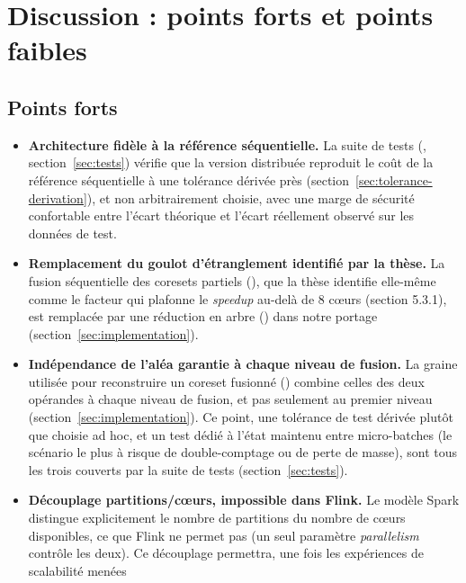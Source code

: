 \section{Discussion : points forts et points faibles}
\label{sec:discussion}

\subsection{Points forts}

\begin{itemize}
  \item \textbf{Architecture fidèle à la référence séquentielle.} La suite
        de tests (, section~\ref{sec:tests}) vérifie que
        la version distribuée reproduit le coût de la référence séquentielle
        à une tolérance dérivée près (section~\ref{sec:tolerance-derivation}),
        et non arbitrairement choisie, avec une marge de sécurité confortable
        entre l'écart théorique et l'écart réellement observé sur les
        données de test.
  \item \textbf{Remplacement du goulot d'étranglement identifié par la
        thèse.} La fusion séquentielle des coresets partiels
        (), que la thèse \cite{bitsakis2018}
        identifie elle-même comme le facteur qui plafonne le
        \emph{speedup} au-delà de 8 cœurs (section 5.3.1), est remplacée par
        une réduction en arbre () dans notre portage
        (section~\ref{sec:implementation}).
  \item \textbf{Indépendance de l'aléa garantie à chaque niveau de fusion.}
        La graine utilisée pour reconstruire un coreset fusionné
        () combine celles des deux opérandes à
        chaque niveau de fusion, et pas seulement au premier niveau
        (section~\ref{sec:implementation}). Ce point, une tolérance de test
        dérivée plutôt que choisie ad hoc, et un test dédié à l'état
        maintenu entre micro-batches (le scénario le plus à risque de
        double-comptage ou de perte de masse), sont tous les trois couverts
        par la suite de tests (section~\ref{sec:tests}).
  \item \textbf{Découplage partitions/cœurs, impossible dans Flink.} Le
        modèle Spark distingue explicitement le nombre de partitions du
        nombre de cœurs disponibles, ce que Flink ne permet pas (un seul
        paramètre \emph{parallelism} contrôle les deux). Ce découplage
        permettra, une fois les expériences de scalabilité menées

\end{itemize}
